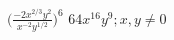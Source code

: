 {$\displaystyle \Bigg( \frac{-2x^{2/3}y^2}{x^{-2}y^{1/2}}\Bigg)^6$}
{$\displaystyle 64x^{16}y^9; x,y \neq 0$}
